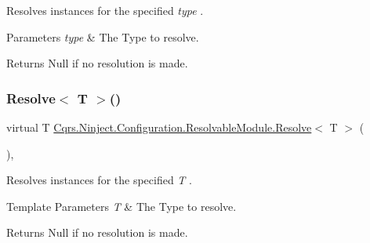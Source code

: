 Resolves instances for the specified {\itshape type} . 


\begin{DoxyParams}{Parameters}
{\em type} & The Type to resolve.\\
\hline
\end{DoxyParams}
\begin{DoxyReturn}{Returns}
Null if no resolution is made.
\end{DoxyReturn}
\mbox{\label{classCqrs_1_1Ninject_1_1Configuration_1_1ResolvableModule_a41a1826cee70c7627e6ec1ef0053f1ea_a41a1826cee70c7627e6ec1ef0053f1ea}} 
\subsubsection{\texorpdfstring{Resolve$<$ T $>$()}{Resolve< T >()}}
{\footnotesize\ttfamily virtual T \hyperlink{classCqrs_1_1Ninject_1_1Configuration_1_1ResolvableModule_a182fa5666c70e6871aa371fc81fb788d_a182fa5666c70e6871aa371fc81fb788d}{Cqrs.\+Ninject.\+Configuration.\+Resolvable\+Module.\+Resolve}$<$ T $>$ (\begin{DoxyParamCaption}{ }\end{DoxyParamCaption})\hspace{0.3cm}{\ttfamily [protected]}, {\ttfamily [virtual]}}



Resolves instances for the specified {\itshape T} . 


\begin{DoxyTemplParams}{Template Parameters}
{\em T} & The Type to resolve.\\
\hline
\end{DoxyTemplParams}
\begin{DoxyReturn}{Returns}
Null if no resolution is made.
\end{DoxyReturn}
